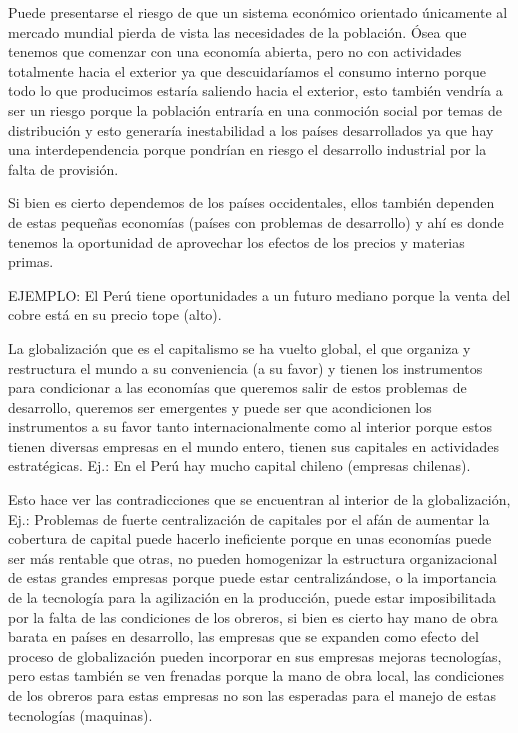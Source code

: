 \documentclass[
  a4paper,
]{article}
\begin{document}
Puede presentarse el riesgo de que un sistema económico orientado
únicamente al mercado mundial pierda de vista las necesidades de la
población. Ósea que tenemos que comenzar con una economía abierta, pero
no con actividades totalmente hacia el exterior ya que descuidaríamos el
consumo interno porque todo lo que producimos estaría saliendo hacia el
exterior, esto también vendría a ser un riesgo porque la población
entraría en una conmoción social por temas de distribución y esto
generaría inestabilidad a los países desarrollados ya que hay una
interdependencia porque pondrían en riesgo el desarrollo industrial por
la falta de provisión.

Si bien es cierto dependemos de los países occidentales, ellos también
dependen de estas pequeñas economías (países con problemas de
desarrollo) y ahí es donde tenemos la oportunidad de aprovechar los
efectos de los precios y materias primas.

EJEMPLO: El Perú tiene oportunidades a un futuro mediano porque la venta
del cobre está en su precio tope (alto).

La globalización que es el capitalismo se ha vuelto global, el que
organiza y restructura el mundo a su conveniencia (a su favor) y tienen
los instrumentos para condicionar a las economías que queremos salir de
estos problemas de desarrollo, queremos ser emergentes y puede ser que
acondicionen los instrumentos a su favor tanto internacionalmente como
al interior porque estos tienen diversas empresas en el mundo entero,
tienen sus capitales en actividades estratégicas. Ej.: En el Perú hay
mucho capital chileno (empresas chilenas).

Esto hace ver las contradicciones que se encuentran al interior de la
globalización, Ej.: Problemas de fuerte centralización de capitales por
el afán de aumentar la cobertura de capital puede hacerlo ineficiente
porque en unas economías puede ser más rentable que otras, no pueden
homogenizar la estructura organizacional de estas grandes empresas
porque puede estar centralizándose, o la importancia de la tecnología
para la agilización en la producción, puede estar imposibilitada por la
falta de las condiciones de los obreros, si bien es cierto hay mano de
obra barata en países en desarrollo, las empresas que se expanden como
efecto del proceso de globalización pueden incorporar en sus empresas
mejoras tecnologías, pero estas también se ven frenadas porque la mano
de obra local, las condiciones de los obreros para estas empresas no son
las esperadas para el manejo de estas tecnologías (maquinas).
\end{document}
